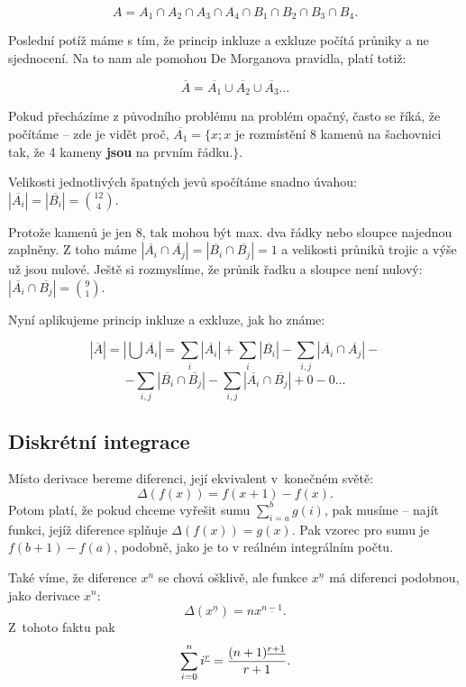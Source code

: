 $$A = A_1 ∩ A_2 ∩ A_3 ∩ A_4 ∩ B_1 ∩ B_2 ∩ B_3 ∩ B_4.$$

Poslední potíž máme s tím, že princip inkluze a exkluze počítá průniky
a ne sjednocení. Na to nam ale pomohou De Morganova pravidla, platí totiž:

$$\overline{A} = \overline{A_1} ∪ \overline{A_2} ∪ \overline{A_3} \dots $$

Pokud přecházíme z původního problému na problém opačný, často se
říká, že počítáme  -- zde je vidět proč,
$\overline{A_1} = \{x; x$ je rozmístění 8 kamenů na šachovnici tak, že
4 kameny {\bf jsou} na prvním řádku.$\}$.

Velikosti jednotlivých špatných jevů spočítáme snadno úvahou:
$|\overline{A_i}| = |\overline{B_i}| = {12 \choose 4}$.

Protože kamenů je jen $8$, tak mohou být max. dva řádky nebo sloupce
najednou zaplněny. Z toho máme $|\overline{A_i} ∩ \overline{A_j}| =
|\overline{B_i} ∩ \overline{B_j}| = 1$ a velikosti průniků trojic a
výše už jsou nulové.  Ještě si rozmyslíme, že průnik řadku a sloupce
není nulový: $|\overline{A_i} ∩ \overline{B_j}| = {9 \choose 1}$.

Nyní aplikujeme princip inkluze a exkluze, jak ho známe:

$$|\overline{A}| = |⋃\overline{A_i}| = ∑_i |\overline{A_i}| + ∑_i |\overline{B_i}| - ∑_{i,j}|\overline{A_i} ∩ \overline{A_j}| -$$
$$ - ∑_{i,j} |\overline{B_i} ∩ \overline{B_j}| - ∑_{i,j}|\overline{A_i} ∩ \overline{B_j}| + 0 - 0 …$$

\subsection{Diskrétní integrace}
Místo derivace bereme diferenci, její ekvivalent v~konečném světě:
$$ \Delta(f(x)) = f(x+1) - f(x).$$
Potom platí, že pokud chceme vyřešit sumu 
$ \sum_{i=a}^{b} g(i) $, pak musíme  -- najít funkci, jejíž
diference splňuje $\Delta(f(x)) = g(x)$. Pak vzorec pro sumu je $f(b+1) - f(a)$, podobně,
jako je to v reálném integrálním počtu.

Také víme, že diference $x^n$ se chová ošklivě, ale funkce $x^{\underline{n}}$ má diferenci
podobnou, jako derivace $x^n$:
$$\Delta(x^{\underline{n}}) = n x^{\underline{n-1}}.$$
Z~tohoto faktu pak
$$\sum_{i=0}^n i^{\underline{r}} = {(n+1)^{\underline{r+1}} \over r+1}.$$

\bye
